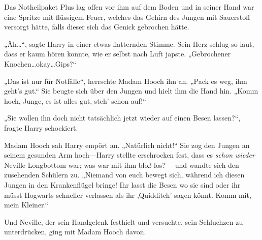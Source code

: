 Das Notheilpaket Plus lag offen vor ihm auf dem Boden und in seiner Hand war eine Spritze mit flüssigem Feuer, welches das Gehirn des Jungen mit Sauerstoff versorgt hätte, falls dieser sich das Genick gebrochen hätte.

„Äh…“, sagte Harry in einer etwas flatternden Stimme. Sein Herz schlug so laut, dass er kaum hören konnte, wie er selbst nach Luft japste. „Gebrochener Knochen…okay…Gips?“

„Das ist nur für Notfälle“, herrschte Madam Hooch ihn an. „Pack es weg, ihm geht’s gut.“ Sie beugte sich über den Jungen und hielt ihm die Hand hin. „Komm hoch, Junge, es ist alles gut, steh’ schon auf!“

„Sie wollen ihn doch nicht tatsächlich jetzt wieder auf einen Besen lassen?“, fragte Harry schockiert.

Madam Hooch sah Harry empört an. „Natürlich nicht!“ Sie zog den Jungen an seinem gesunden Arm hoch—Harry stellte erschrocken fest, dass es \emph{schon wieder} Neville Longbottom war; was war mit ihm bloß los? —und wandte sich den zusehenden Schülern zu. „Niemand von euch bewegt sich, während ich diesen Jungen in den Krankenflügel bringe! Ihr lasst die Besen wo sie sind oder ihr müsst Hogwarts schneller verlassen als ihr ‚Quidditch’ sagen könnt. Komm mit, mein Kleiner.“

Und Neville, der sein Handgelenk festhielt und versuchte, sein Schluchzen zu unterdrücken, ging mit Madam Hooch davon.


